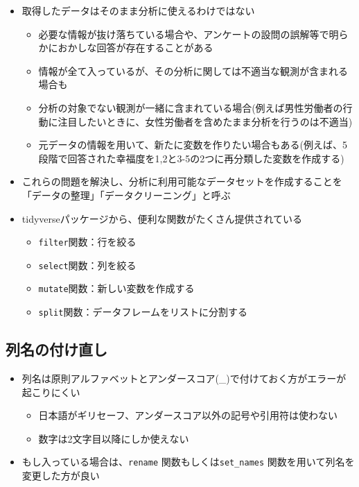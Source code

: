 \documentclass[
]{ltjsarticle}
\providecommand{\tightlist}{%
  \setlength{\itemsep}{0pt}\setlength{\parskip}{0pt}}
\begin{document}
\begin{itemize}
\tightlist
\item
  取得したデータはそのまま分析に使えるわけではない

  \begin{itemize}
  \tightlist
  \item
    必要な情報が抜け落ちている場合や、アンケートの設問の誤解等で明らかにおかしな回答が存在することがある
  \item
    情報が全て入っているが、その分析に関しては不適当な観測が含まれる場合も
  \item
    分析の対象でない観測が一緒に含まれている場合(例えば男性労働者の行動に注目したいときに、女性労働者を含めたまま分析を行うのは不適当)
  \item
    元データの情報を用いて、新たに変数を作りたい場合もある(例えば、5段階で回答された幸福度を1,2と3-5の2つに再分類した変数を作成する)
  \end{itemize}
\item
  これらの問題を解決し、分析に利用可能なデータセットを作成することを「データの整理」「データクリーニング」と呼ぶ
\item
  tidyverseパッケージから、便利な関数がたくさん提供されている

  \begin{itemize}
  \tightlist
  \item
    \texttt{filter}関数：行を絞る
  \item
    \texttt{select}関数：列を絞る
  \item
    \texttt{mutate}関数：新しい変数を作成する
  \item
    \texttt{split}関数：データフレームをリストに分割する
  \end{itemize}
\end{itemize}

\hypertarget{ux5217ux540dux306eux4ed8ux3051ux76f4ux3057}{%
\subsection{列名の付け直し}\label{ux5217ux540dux306eux4ed8ux3051ux76f4ux3057}}

\begin{itemize}
\tightlist
\item
  列名は原則アルファベットとアンダースコア(\_)で付けておく方がエラーが起こりにくい

  \begin{itemize}
  \tightlist
  \item
    日本語がギリセーフ、アンダースコア以外の記号や引用符は使わない
  \item
    数字は2文字目以降にしか使えない
  \end{itemize}
\item
  もし入っている場合は、\texttt{rename} 関数もしくは\texttt{set\_names}
  関数を用いて列名を変更した方が良い
\end{itemize}
\end{document}

